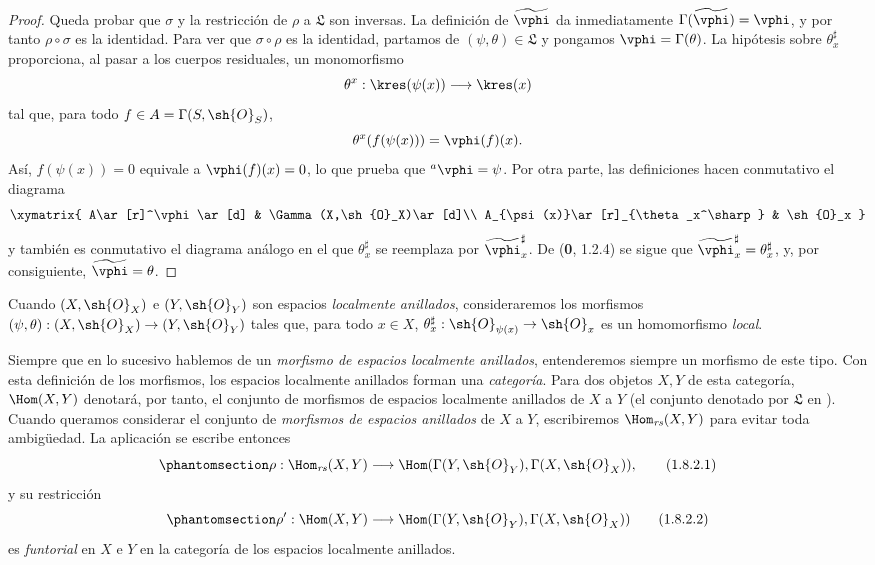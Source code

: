 \documentclass[oneside,10pt]{amsart}
\makeatletter
\newcommand{\ega@arrow}[2]{\mathchoice{#1}{#2}{#2}{#2}}
\renewcommand{\to}{\ega@arrow{\longrightarrow}{\rightarrow}}
\newcommand{\oldpage}[2][]{\marginnote{\normalfont\footnotesize\textbf{#1}~|~#2}\ignorespaces}
\let\EGAOriginalLabel\label
\renewcommand{\label}[1]{\phantomsection\EGAOriginalLabel{#1}}
\makeatother
\begin{document}
\begin{proof}
Queda probar que $\sigma$ y la restricción de $\rho$ a $\mathfrak{L}$
son inversas. La definición de $\widetilde{\vphi}$ da inmediatamente
$\Gamma(\widetilde{\vphi})=\vphi$, y por tanto $\rho\circ\sigma$ es la
identidad. Para ver que $\sigma\circ\rho$ es la identidad, partamos de
$(\psi,\theta)\in\mathfrak{L}$ y pongamos $\vphi=\Gamma(\theta)$. La
hipótesis sobre $\theta_x^\sharp$ proporciona, al pasar a los cuerpos
residuales, un monomorfismo
\[
  \theta^x:\kres(\psi(x))\to\kres(x)
\]
tal que, para todo $f\in A=\Gamma(S,\sh{O}_S)$,
\[
  \theta^x(f(\psi(x)))=\vphi(f)(x).
\]
Así, $f(\psi(x))=0$ equivale a $\vphi(f)(x)=0$, lo que prueba que
${}^a\vphi=\psi$. Por otra parte, las definiciones hacen conmutativo
el diagrama
\[
  \xymatrix{
    A\ar[r]^\vphi\ar[d] &
    \Gamma(X,\sh{O}_X)\ar[d]\\
    A_{\psi(x)}\ar[r]_{\theta_x^\sharp} &
    \sh{O}_x
  }
\]
y también es conmutativo el diagrama análogo en el que
$\theta_x^\sharp$ se reemplaza por $\widetilde{\vphi}_x^\sharp$. De
(\textbf 0, 1.2.4) se sigue que
$\widetilde{\vphi}_x^\sharp=\theta_x^\sharp$, y, por consiguiente,
$\widetilde{\vphi}=\theta$.
\end{proof}

\begin{env}[1.8.2]
\label{ega2:addendum:I.1.8.2}
Cuando $(X,\sh{O}_X)$ e $(Y,\sh{O}_Y)$ son espacios \emph{localmente
anillados}, consideraremos los morfismos
$(\psi,\theta):(X,\sh{O}_X)\to(Y,\sh{O}_Y)$ tales que, para todo
$x\in X$, $\theta_x^\sharp:\sh{O}_{\psi(x)}\to\sh{O}_x$ es un
homomorfismo \emph{local}.

Siempre que en lo sucesivo hablemos de un
\oldpage[II]{219}
\emph{morfismo de espacios localmente anillados}, entenderemos siempre
un morfismo de este tipo. Con esta definición de los morfismos, los
espacios localmente anillados forman una \emph{categoría}. Para dos objetos
$X,Y$ de esta categoría, $\Hom(X,Y)$ denotará, por tanto, el conjunto
de morfismos de espacios localmente anillados de $X$ a $Y$ (el
conjunto denotado por $\mathfrak{L}$ en ). Cuando queramos
considerar el conjunto de \emph{morfismos de espacios anillados} de $X$ a
$Y$, escribiremos $\Hom_{\mathit{rs}}(X,Y)$ para evitar toda
ambigüedad. La aplicación  se escribe entonces
\begin{equation}
\label{ega2:addendum:I.1.8.2.1}
  \rho:\Hom_{\mathit{rs}}(X,Y)
  \to\Hom(\Gamma(Y,\sh{O}_Y),\Gamma(X,\sh{O}_X)),
\tag{1.8.2.1}
\end{equation}
y su restricción
\begin{equation}
\label{ega2:addendum:I.1.8.2.2}
  \rho':\Hom(X,Y)
  \to\Hom(\Gamma(Y,\sh{O}_Y),\Gamma(X,\sh{O}_X))
\tag{1.8.2.2}
\end{equation}
es \emph{funtorial} en $X$ e $Y$ en la categoría de los espacios localmente
anillados.
\end{env}
\end{document}

